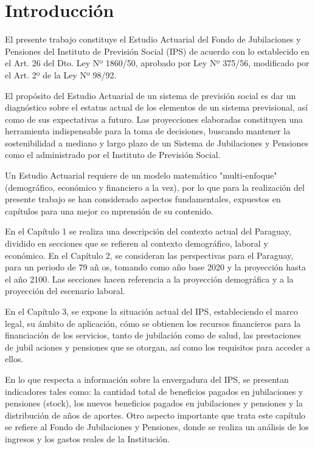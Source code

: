 \documentclass[a4paper,11pt]{article}
\begin{document}
\newpage
\tableofcontents




\newpage
\section{Introducción}

El presente trabajo constituye el Estudio Actuarial del Fondo de Jubilaciones y Pensiones del Instituto de Previsión Social (IPS) de acuerdo con lo establecido en el Art. 26 del Dto. Ley Nº 1860/50, aprobado por Ley Nº 375/56, modificado por el Art. 2º 
de la Ley Nº 98/92.

El propósito del Estudio Actuarial de un sistema de previsión social es dar un diagnóstico sobre el estatus actual de los elementos de un sistema previsional, así como de sus expectativas a futuro. Las proyecciones elaboradas constituyen una herramienta
 indispensable para la toma de decisiones, buscando mantener la sostenibilidad a mediano y largo plazo de un Sistema de Jubilaciones y Pensiones como el administrado por el Instituto de Previsión Social.

Un Estudio Actuarial requiere de un modelo matemático "multi-enfoque" (demográfico, económico y financiero a la vez), por lo que para la realización del presente trabajo se han considerado aspectos fundamentales, expuestos en capítulos para una mejor co
mprensión de su contenido. 

En el Capítulo 1 se realiza una descripción del contexto actual del Paraguay, dividido en secciones que se refieren al contexto demográfico, laboral y económico. En el Capítulo 2, se consideran las perspectivas para el Paraguay, para un periodo de 79 añ
os, tomando como año base 2020 y la proyección hasta el año 2100.  Las secciones hacen referencia a la proyección demográfica y a la proyección del escenario laboral.

En el Capítulo 3, se expone la situación actual del IPS, estableciendo el marco legal, su ámbito de aplicación, cómo se obtienen los recursos financieros para la financiación de los servicios, tanto de jubilación como de salud, las prestaciones de jubil
aciones y pensiones que se otorgan, así como los requisitos para acceder a ellos.

En lo que respecta a información sobre la envergadura del IPS, se presentan indicadores tales como: la cantidad total de beneficios pagados en jubilaciones y pensiones (stock), los nuevos beneficios pagados en jubilaciones y pensiones y la distribución 
de años de aportes. Otro aspecto importante que trata este capítulo se refiere al Fondo de Jubilaciones y Pensiones, donde se realiza un análisis de los ingresos y los gastos reales de la Institución.
\end{document}
